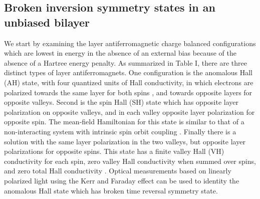 \documentclass[twocolumn,prb,showpacs,preprintnumbers,amsmath,amssymb]{revtex4}
\begin{document}
\subsection{Broken inversion symmetry states in an unbiased bilayer}
We start by examining the layer antiferromagnetic charge balanced configurations which
are lowest in energy 
in the absence of an external bias 
because\cite{pmag} of the absence of a Hartree energy penalty. 
As summarized in Table I, there are three distinct types of layer antiferromagnets. \cite{xiaofan} 
One configuration is the anomalous Hall (AH) state, with four quantized units of Hall conductivity, 
in which electrons are polarized towards the same layer for both spins \cite{nandkishore2},
and towards opposite layers for opposite valleys.
Second is the spin Hall (SH) state which has opposite layer polarization on opposite
valleys, and in each valley opposite layer polarization for opposite spin.
The mean-field Hamiltonian for this state is similar to 
that of a non-interacting system with intrinsic spin orbit coupling \cite{prada}.  
Finally there is a solution with the same layer polarization in the two valleys, 
but opposite layer polarizations for opposite spins.  
This state has a finite valley Hall (VH) conductivity for each spin,
zero valley Hall conductivity when summed over spins, and 
zero total Hall conductivity \cite{xiao,morpurgo}.
Optical measurements based on linearly polarized light using the Kerr and Faraday 
effect can be used to identity the anomalous Hall state which has broken time 
reversal symmetry state.\cite{kerr}
\end{document}
